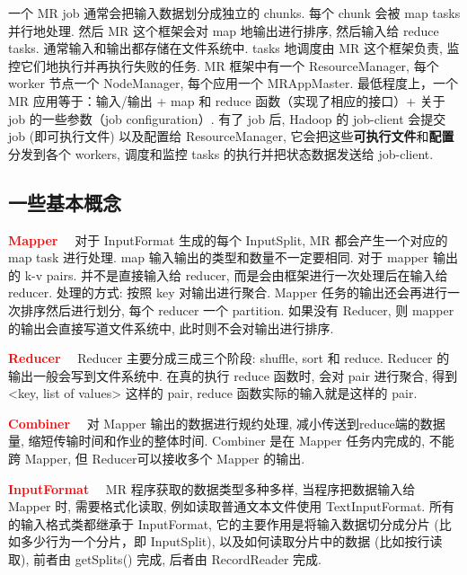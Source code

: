 一个 MR job 通常会把输入数据划分成独立的 chunks. 每个 chunk 会被 map tasks 并行地处理. 然后 MR 这个框架会对 map 地输出进行排序, 然后输入给 reduce tasks. 通常输入和输出都存储在文件系统中. tasks 地调度由 MR 这个框架负责, 监控它们地执行并再执行失败的任务. MR 框架中有一个 ResourceManager, 每个 worker 节点一个 NodeManager, 每个应用一个 MRAppMaster. 最低程度上，一个 MR 应用等于：输入/输出 + map 和 reduce 函数（实现了相应的接口）+ 关于 job 的一些参数（job configuration）. 有了 job 后, Hadoop 的 job-client 会提交 job (即可执行文件) 以及配置给 ResourceManager, 它会把这些\textbf{可执行文件}和\textbf{配置}分发到各个 workers, 调度和监控 tasks 的执行并把状态数据发送给 job-client.

\subsection{一些基本概念}

\par{\textbf{\textcolor{red}{Mapper}}}$\quad$ 对于 InputFormat 生成的每个 InputSplit, MR 都会产生一个对应的 map task 进行处理. map 输入输出的类型和数量不一定要相同. 对于 mapper 输出的 k-v pairs. 并不是直接输入给 reducer, 而是会由框架进行一次处理后在输入给 reducer. 处理的方式: 按照 key 对输出进行聚合. Mapper 任务的输出还会再进行一次排序然后进行划分, 每个 reducer 一个 partition. 如果没有 Reducer, 则 mapper 的输出会直接写道文件系统中, 此时则不会对输出进行排序. 

\par{\textbf{\textcolor{red}{Reducer}}}$\quad$ Reducer 主要分成三成三个阶段: shuffle, sort 和 reduce. Reducer 的输出一般会写到文件系统中. 在真的执行 reduce 函数时, 会对 pair 进行聚合, 得到 <key, list of values> 这样的 pair, reduce 函数实际的输入就是这样的 pair. 

\par{\textbf{\textcolor{red}{Combiner}}}$\quad$ 对 Mapper 输出的数据进行规约处理, 减小传送到reduce端的数据量, 缩短传输时间和作业的整体时间. Combiner 是在 Mapper 任务内完成的, 不能跨 Mapper, 但 Reducer可以接收多个 Mapper 的输出.

\par{\textbf{\textcolor{red}{InputFormat}}}$\quad$ MR 程序获取的数据类型多种多样, 当程序把数据输入给 Mapper 时, 需要格式化读取, 例如读取普通文本文件使用 TextInputFormat. 所有的输入格式类都继承于 InputFormat, 它的主要作用是将输入数据切分成分片 (比如多少行为一个分片，即 InputSplit), 以及如何读取分片中的数据 (比如按行读取), 前者由 getSplits() 完成, 后者由 RecordReader 完成.

